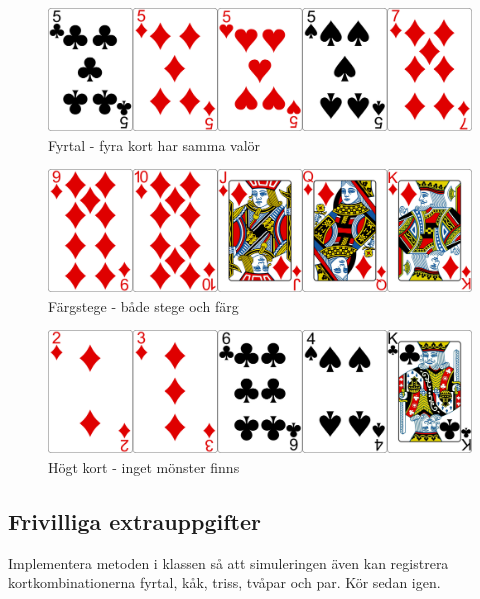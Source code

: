 \begin{figure}[h]
 \begin{minipage}[c]{0.5\textwidth}
  \includegraphics[width=\textwidth]{../img/w05-hands/fours.png}
 \end{minipage}
 \begin{minipage}[c]{0.3\textwidth}
  \caption{Fyrtal - fyra kort har samma valör}
 \end{minipage}
\end{figure}

\begin{figure}[h]
 \begin{minipage}[c]{0.5\textwidth}
  \includegraphics[width=\textwidth]{../img/w05-hands/straightflush.png}
 \end{minipage}
 \begin{minipage}[c]{0.3\textwidth}
  \caption{Färgstege - både stege och färg}
 \end{minipage}
\end{figure}

\begin{figure}[h]
 \begin{minipage}[c]{0.5\textwidth}
  \includegraphics[width=\textwidth]{../img/w05-hands/none.png}
 \end{minipage}
 \begin{minipage}[c]{0.3\textwidth}
  \caption{Högt kort - inget mönster finns}
 \end{minipage}
\end{figure}

\subsection{Frivilliga extrauppgifter}

\Task Implementera metoden  i klassen  så att simuleringen även kan registrera kortkombinationerna fyrtal, kåk, triss, tvåpar och par. Kör sedan  igen.
